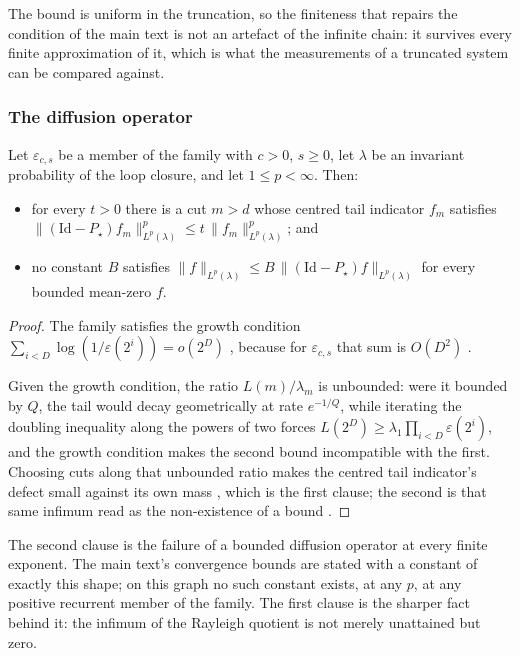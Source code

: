 \noindent The bound is uniform in the truncation, so the finiteness that repairs the condition of the
main text is not an artefact of the infinite chain: it survives every finite approximation of
it, which is what the measurements of a truncated system can be compared against.


\subsubsection{The diffusion operator}


\begin{theorem}
  \label{thm:main_unbounded}
Let $\varepsilon_{c,s}$ be a member of the family with $c>0$, $s\geq0$, let $\lambda$ be an
invariant probability of the loop closure, and let $1\leq p<\infty$. Then:
\begin{itemize}
  \item for every $t>0$ there is a cut $m>d$ whose centred tail indicator $f_m$ satisfies
        $\|(\mathrm{Id}-P_\star)f_m\|^p_{L^p(\lambda)}\leq t\,\|f_m\|^p_{L^p(\lambda)}$; and
  \item no constant $B$ satisfies $\|f\|_{L^p(\lambda)}\leq B\,\|(\mathrm{Id}-P_\star)f\|_{L^p(\lambda)}$
        for every bounded mean-zero $f$.
\end{itemize}
\end{theorem}

\begin{proof}
The family satisfies the growth condition $\sum_{i<D}\log(1/\varepsilon(2^i))=o(2^{D})$
, because for $\varepsilon_{c,s}$ that sum is $O(D^2)$
.

Given the growth condition, the ratio $L(m)/\lambda_m$ is unbounded: were it bounded by $Q$,
the tail would decay geometrically at rate $e^{-1/Q}$, while iterating the doubling inequality
along the powers of two forces $L(2^{D})\geq\lambda_1\prod_{i<D}\varepsilon(2^{i})$, and the
growth condition makes the second bound incompatible with the first. Choosing cuts along that
unbounded ratio makes the centred tail indicator's defect small against its own mass
, which is the first clause; the second is
that same infimum read as the non-existence of a bound
.
\end{proof}

\noindent The second clause is the failure of a bounded diffusion operator at every finite exponent. The
main text's convergence bounds are stated with a constant of exactly this shape; on this graph
no such constant exists, at any $p$, at any positive recurrent member of the family. The first
clause is the sharper fact behind it: the infimum of the Rayleigh quotient is not merely
unattained but zero.



